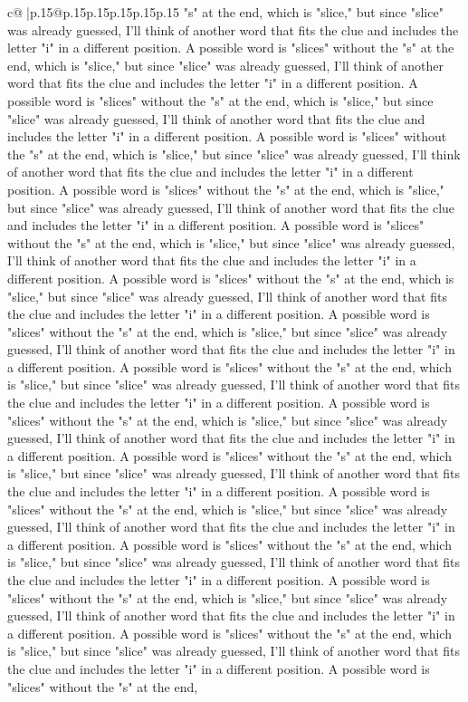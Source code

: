 \documentclass{article}
\begin{document}
{\begin{supertabular}{c@{$\;$}|p{.15\linewidth}@{}p{.15\linewidth}p{.15\linewidth}p{.15\linewidth}p{.15\linewidth}p{.15\linewidth}}
{{{"s" at the end, which is "slice," but since "slice" was already guessed, I'll think of another word that fits the clue and includes the letter "i" in a different position. A possible word is "slices" without the "s" at the end, which is "slice," but since "slice" was already guessed, I'll think of another word that fits the clue and includes the letter "i" in a different position. A possible word is "slices" without the "s" at the end, which is "slice," but since "slice" was already guessed, I'll think of another word that fits the clue and includes the letter "i" in a different position. A possible word is "slices" without the "s" at the end, which is "slice," but since "slice" was already guessed, I'll think of another word that fits the clue and includes the letter "i" in a different position. A possible word is "slices" without the "s" at the end, which is "slice," but since "slice" was already guessed, I'll think of another word that fits the clue and includes the letter "i" in a different position. A possible word is "slices" without the "s" at the end, which is "slice," but since "slice" was already guessed, I'll think of another word that fits the clue and includes the letter "i" in a different position. A possible word is "slices" without the "s" at the end, which is "slice," but since "slice" was already guessed, I'll think of another word that fits the clue and includes the letter "i" in a different position. A possible word is "slices" without the "s" at the end, which is "slice," but since "slice" was already guessed, I'll think of another word that fits the clue and includes the letter "i" in a different position. A possible word is "slices" without the "s" at the end, which is "slice," but since "slice" was already guessed, I'll think of another word that fits the clue and includes the letter "i" in a different position. A possible word is "slices" without the "s" at the end, which is "slice," but since "slice" was already guessed, I'll think of another word that fits the clue and includes the letter "i" in a different position. A possible word is "slices" without the "s" at the end, which is "slice," but since "slice" was already guessed, I'll think of another word that fits the clue and includes the letter "i" in a different position. A possible word is "slices" without the "s" at the end, which is "slice," but since "slice" was already guessed, I'll think of another word that fits the clue and includes the letter "i" in a different position. A possible word is "slices" without the "s" at the end, which is "slice," but since "slice" was already guessed, I'll think of another word that fits the clue and includes the letter "i" in a different position. A possible word is "slices" without the "s" at the end, which is "slice," but since "slice" was already guessed, I'll think of another word that fits the clue and includes the letter "i" in a different position. A possible word is "slices" without the "s" at the end, which is "slice," but since "slice" was already guessed, I'll think of another word that fits the clue and includes the letter "i" in a different position. A possible word is "slices" without the "s" at the end, }}}
\end{supertabular}}
\end{document}
